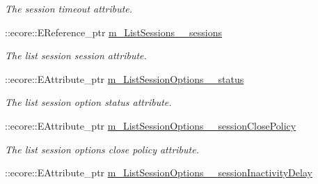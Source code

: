 \begin{DoxyCompactItemize}
\begin{DoxyCompactList}\small\item\em The session timeout attribute. \item\end{DoxyCompactList}\item 
\hypertarget{classUMS__Data_1_1UMS__DataPackage_ae5ad73e48556a3d62ec32ffeccdaf993}{
::ecore::EReference\_\-ptr \hyperlink{classUMS__Data_1_1UMS__DataPackage_ae5ad73e48556a3d62ec32ffeccdaf993}{m\_\-ListSessions\_\-\_\-sessions}}
\label{classUMS__Data_1_1UMS__DataPackage_ae5ad73e48556a3d62ec32ffeccdaf993}

\begin{DoxyCompactList}\small\item\em The list session session attribute. \item\end{DoxyCompactList}\item 
\hypertarget{classUMS__Data_1_1UMS__DataPackage_a94c95e418a1b6d0fa8e9f880d04dc2c5}{
::ecore::EAttribute\_\-ptr \hyperlink{classUMS__Data_1_1UMS__DataPackage_a94c95e418a1b6d0fa8e9f880d04dc2c5}{m\_\-ListSessionOptions\_\-\_\-status}}
\label{classUMS__Data_1_1UMS__DataPackage_a94c95e418a1b6d0fa8e9f880d04dc2c5}

\begin{DoxyCompactList}\small\item\em The list session option status attribute. \item\end{DoxyCompactList}\item 
\hypertarget{classUMS__Data_1_1UMS__DataPackage_a8105d408470862bfc1a5d94aea85dd96}{
::ecore::EAttribute\_\-ptr \hyperlink{classUMS__Data_1_1UMS__DataPackage_a8105d408470862bfc1a5d94aea85dd96}{m\_\-ListSessionOptions\_\-\_\-sessionClosePolicy}}
\label{classUMS__Data_1_1UMS__DataPackage_a8105d408470862bfc1a5d94aea85dd96}

\begin{DoxyCompactList}\small\item\em The list session options close policy attribute. \item\end{DoxyCompactList}\item 
\hypertarget{classUMS__Data_1_1UMS__DataPackage_a4d021389b1e7a2efb6bfdfe0515f42ce}{
::ecore::EAttribute\_\-ptr \hyperlink{classUMS__Data_1_1UMS__DataPackage_a4d021389b1e7a2efb6bfdfe0515f42ce}{m\_\-ListSessionOptions\_\-\_\-sessionInactivityDelay}}
\label{classUMS__Data_1_1UMS__DataPackage_a4d021389b1e7a2efb6bfdfe0515f42ce}


\end{DoxyCompactItemize}
